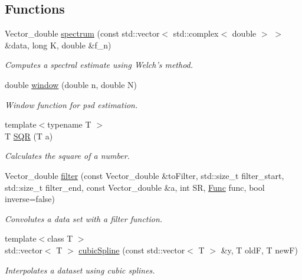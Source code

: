 \subsection*{Functions}
\begin{DoxyCompactItemize}
\item 
Vector\_\-double \hyperlink{group__stfgen_ga2fcd50c88877838de7ed4b52e1fedb59}{spectrum} (const std::vector$<$ std::complex$<$ double $>$ $>$ \&data, long K, double \&f\_\-n)
\begin{DoxyCompactList}\small\item\em Computes a spectral estimate using Welch's method. \item\end{DoxyCompactList}\item 
double \hyperlink{group__stfgen_gacdf87f88e8ac06ad60a3f3b206b0cd91}{window} (double n, double N)
\begin{DoxyCompactList}\small\item\em Window function for psd estimation. \item\end{DoxyCompactList}\item 
{\footnotesize template$<$typename T $>$ }\\T \hyperlink{group__stfgen_ga62f78deb330cc40d8ae6da48cdbec951}{SQR} (T a)
\begin{DoxyCompactList}\small\item\em Calculates the square of a number. \item\end{DoxyCompactList}\item 
Vector\_\-double \hyperlink{group__stfgen_ga8d4bf7a86a487551837817a7d6d09cf1}{filter} (const Vector\_\-double \&toFilter, std::size\_\-t filter\_\-start, std::size\_\-t filter\_\-end, const Vector\_\-double \&a, int SR, \hyperlink{group__stfgen_ga11d6ec55abceacf5fdd47f9fc889d9a3}{Func} func, bool inverse=false)
\begin{DoxyCompactList}\small\item\em Convolutes a data set with a filter function. \item\end{DoxyCompactList}\item 
{\footnotesize template$<$class T $>$ }\\std::vector$<$ T $>$ \hyperlink{group__stfgen_gad6d6bf4577ec605215a4a374a3505a03}{cubicSpline} (const std::vector$<$ T $>$ \&y, T oldF, T newF)
\begin{DoxyCompactList}\small\item\em Interpolates a dataset using cubic splines. \item\end{DoxyCompactList}\item 

\end{DoxyCompactItemize}
